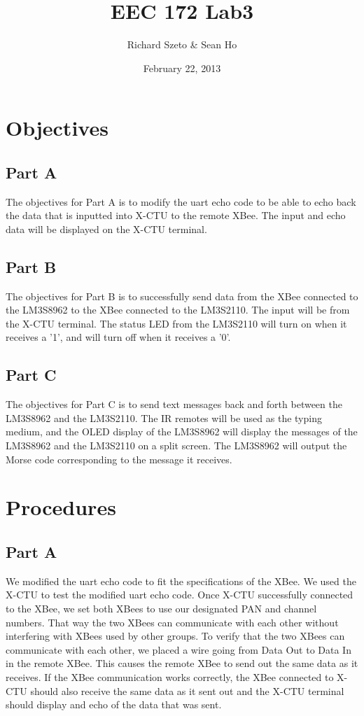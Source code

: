 \documentclass[11pt, titlepage]{article}
\title{EEC 172 Lab3}
\author{Richard Szeto \& Sean Ho}
\date{February 22, 2013}
\begin{document}
    \maketitle
    
    \section{Objectives}
        \subsection{Part A}
            The objectives for Part A is to modify the uart echo code to be able to echo back the data that is inputted into X-CTU to the remote XBee. The input and echo data will be displayed on the X-CTU terminal.
        
        \subsection{Part B}
            The objectives for Part B is to successfully send data from the XBee connected to the LM3S8962 to the XBee connected to the LM3S2110. The input will be from the X-CTU terminal. The status LED from the LM3S2110 will turn on when it receives a '1', and will turn off when it receives a '0'.
        
        \subsection{Part C}
            The objectives for Part C is to send text messages back and forth between the LM3S8962 and the LM3S2110. The IR remotes will be used as the typing medium, and the OLED display of the LM3S8962 will display the messages of the LM3S8962 and the LM3S2110 on a split screen. The LM3S8962 will output the Morse code corresponding to the message it receives.
    
    \section{Procedures}
        \subsection{Part A}
            We modified the uart echo code to fit the specifications of the XBee. We used the X-CTU to test the modified uart echo code. Once X-CTU successfully connected to the XBee, we set both XBees to use our designated PAN and channel numbers. That way the two XBees can communicate with each other without interfering with XBees used by other groups. To verify that the two XBees can communicate with each other, we placed a wire going from Data Out to Data In in the remote XBee. This causes the remote XBee to send out the same data as it receives. If the XBee communication works correctly, the XBee connected to X-CTU should also receive the same data as it sent out and the X-CTU terminal should display and echo of the data that was sent.
        
\end{document}
